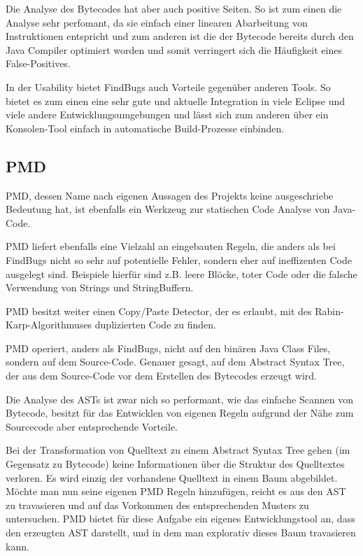 Die Analyse des Bytecodes hat aber auch positive Seiten. So ist zum einen die Analyse sehr perfomant, da sie einfach einer linearen Abarbeitung von Instruktionen entspricht und zum anderen ist die der Bytecode bereits durch den Java Compiler optimiert worden und somit verringert sich die Häufigkeit eines False-Positives.

In der Usability bietet FindBugs auch Vorteile gegenüber anderen Tools. So bietet es zum einen eine sehr gute und aktuelle Integration in viele Eclipse und viele andere Entwicklungsumgebungen und lässt sich zum anderen über ein Konsolen-Tool einfach in automatische Build-Prozesse einbinden.


\subsection{PMD}
PMD, dessen Name nach eigenen Aussagen des Projekts keine ausgeschriebe Bedeutung hat, ist ebenfalls ein Werkzeug zur statischen Code Analyse von Java-Code. 

PMD liefert ebenfalls eine Vielzahl an eingebauten Regeln, die anders als bei FindBugs nicht so sehr auf potentielle Fehler, sondern eher auf ineffizenten Code ausgelegt sind. Beispiele hierfür sind z.B. leere Blöcke, toter Code oder die falsche Verwendung von Strings und StringBuffern. 

PMD besitzt weiter einen Copy/Paste Detector, der es erlaubt, mit des Rabin-Karp-Algorithmuses duplizierten Code zu finden.

PMD operiert, anders als FindBugs, nicht auf den binären Java Class Files, sondern auf dem Source-Code. Genauer gesagt, auf dem Abstract Syntax Tree, der aus dem Source-Code vor dem Erstellen des Bytecodes erzeugt wird. 

Die Analyse des ASTs ist zwar nich so performant, wie das einfache Scannen von Bytecode, besitzt für das Entwicklen von eigenen Regeln aufgrund der Nähe zum Sourcecode aber entsprechende Vorteile.

Bei der Transformation von Quelltext zu einem Abstract Syntax Tree gehen (im Gegensatz zu Bytecode) keine Informationen über die Struktur des Quelltextes verloren. Es wird einzig der vorhandene Quelltext in einem Baum abgebildet. 
Möchte man nun seine eigenen PMD Regeln hinzufügen, reicht es aus den AST zu travasieren und auf das Vorkommen des entsprechenden Musters zu untersuchen. PMD bietet für diese Aufgabe ein eigenes Entwicklungstool an, dass den erzeugten AST darstellt, und in dem man explorativ dieses Baum travasieren kann.


